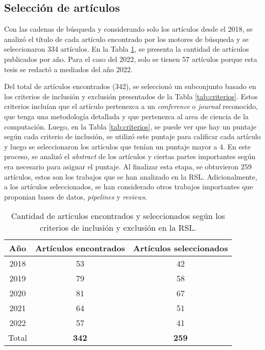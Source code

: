 \subsection{Selección de artículos}

Con las cadenas de búsqueda y considerando solo los artículos desde el 2018, se analizó el título de cada artículo encontrado por los motores de búsqueda y se seleccionaron 334 artículos. En la Tabla \ref{tab:number_papers}, se presenta la cantidad de artículos publicados por año. Para el caso del 2022, solo se tienen 57 artículos porque esta tesis se redactó a mediados del año 2022. 

Del total de artículos encontrados (342), se seleccionó un subconjunto basado en los criterios de inclusión y exclusión presentados de la Tabla  \ref{tab:criterios}. Estos criterios incluían que el artículo pertenezca a un \textit{conference} o \textit{journal} reconocido, que tenga una metodología detallada y que pertenezca al area de ciencia de la computación. Luego, en la Tabla \ref{tab:criterios}, se puede ver que hay un puntaje según cada criterio de inclusión, se utilizó este puntaje para calificar cada artículo y luego se seleccionaron los artículos que tenían un puntaje mayor a 4. En este proceso, se analizó el \textit{abstract} de los artículos y ciertas partes importantes según era necesario para asignar el puntaje. Al finalizar esta etapa, se obtuvieron 259 artículos, estos son los trabajos que se han analizado en la RSL. Adicionalmente, a los artículos seleccionados, se han considerado otros trabajos importantes que proponian bases de datos, \textit{pipelines} y \textit{reviews}.




\begin{table}[H]
	\begin{center}
		\caption{Cantidad de artículos encontrados y seleccionados según los criterios de inclusión y exclusión en la RSL.}
		\label{tab:number_papers}
		\setlength{\tabcolsep}{0.5em} %
		{\renewcommand{\arraystretch}{1.2}%
			\begin{tabular}{ccc}
					\textbf{Año} & \textbf{Artículos encontrados} & \textbf{Artículos seleccionados}\\ \hline
				    2018 & 53 & 42 \\
				    2019 & 79 & 58 \\
				    2020 & 81 & 67 \\
				    2021 & 64 & 51 \\
				    2022 & 57 & 41 \\ \hline
				    Total & \textbf{342} & \textbf{259} \\
			\end{tabular}
		}
	\end{center}
\end{table}

